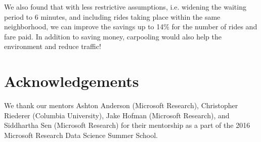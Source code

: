 \documentclass[twocolumn]{article}
\begin{document}
We also found that with less restrictive assumptions, i.e. widening the waiting period to 6 minutes, and including rides taking place within the same neighborhood, we can improve the savings up to 14\% for the number of rides and fare paid. In addition to saving money, carpooling would also help the environment and reduce traffic! 

\section{Acknowledgements}
We thank our mentors Ashton Anderson (Microsoft Research), Christopher Riederer (Columbia University), Jake Hofman (Microsoft Research), and Siddhartha Sen (Microsoft Research) for their mentorship as a part of the 2016 Microsoft Research Data Science Summer School. 

\vspace{-0.5em}


\end{document}
